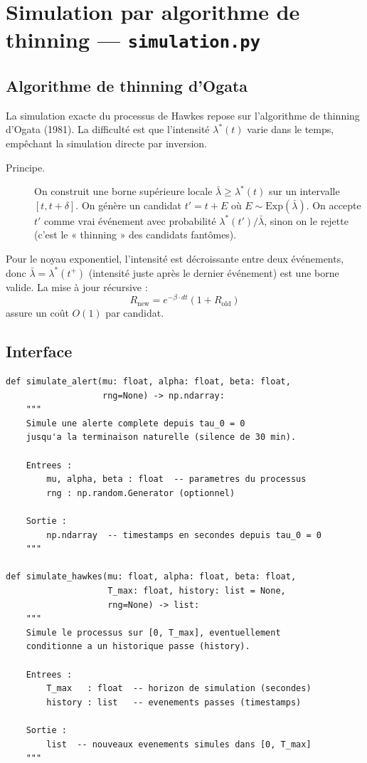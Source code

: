 \documentclass[a4paper,11pt]{article}
\begin{document}
\section{Simulation par algorithme de thinning --- \texttt{simulation.py}}

\subsection{Algorithme de thinning d'Ogata}

La simulation exacte du processus de Hawkes repose sur l'algorithme de thinning d'Ogata (1981). La difficulté est que l'intensité $\lambda^*(t)$ varie dans le temps, empêchant la simulation directe par inversion.

\begin{description}
    \item[Principe.] On construit une borne supérieure locale $\bar\lambda \geq \lambda^*(t)$ sur un intervalle $[t, t + \delta]$. On génère un candidat $t' = t + E$ où $E \sim \mathrm{Exp}(\bar\lambda)$. On accepte $t'$ comme vrai événement avec probabilité $\lambda^*(t')/\bar\lambda$, sinon on le rejette (c'est le « thinning » des candidats fantômes).
\end{description}

Pour le noyau exponentiel, l'intensité est décroissante entre deux événements, donc $\bar\lambda = \lambda^*(t^+)$ (intensité juste après le dernier événement) est une borne valide. La mise à jour récursive :
\[
R_{\text{new}} = e^{-\beta \cdot dt}(1 + R_{\text{old}})
\]
assure un coût $O(1)$ par candidat.

\subsection{Interface}

\begin{lstlisting}
def simulate_alert(mu: float, alpha: float, beta: float,
                   rng=None) -> np.ndarray:
    """
    Simule une alerte complete depuis tau_0 = 0
    jusqu'a la terminaison naturelle (silence de 30 min).

    Entrees :
        mu, alpha, beta : float  -- parametres du processus
        rng : np.random.Generator (optionnel)

    Sortie :
        np.ndarray  -- timestamps en secondes depuis tau_0 = 0
    """

def simulate_hawkes(mu: float, alpha: float, beta: float,
                    T_max: float, history: list = None,
                    rng=None) -> list:
    """
    Simule le processus sur [0, T_max], eventuellement
    conditionne a un historique passe (history).

    Entrees :
        T_max   : float  -- horizon de simulation (secondes)
        history : list   -- evenements passes (timestamps)

    Sortie :
        list  -- nouveaux evenements simules dans [0, T_max]
    """
\end{lstlisting}
\end{document}
